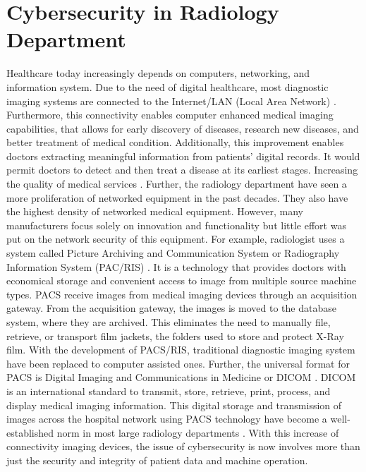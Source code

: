 \documentclass[pdf,bookmarks,colorlinks=true]{IEEEtran}
\begin{document}
\section{Cybersecurity in Radiology Department}
\label{sec:Radiology}
Healthcare today increasingly depends on computers, networking, and information system. Due to the need of digital healthcare, most diagnostic imaging systems are connected to the Internet/LAN (Local Area Network) \cite{ma2019medical}. Furthermore, this connectivity enables computer enhanced medical imaging capabilities, that allows for early discovery of diseases, research new diseases, and better treatment of medical condition. Additionally, this improvement enables doctors extracting meaningful information from patients' digital records. It would permit doctors to detect and then treat a disease at its earliest stages. Increasing the quality of medical services \cite{Marwan}.
Further, the radiology department have seen a more proliferation of networked equipment in the past decades. They also have the highest density of networked medical equipment. However, many manufacturers focus solely on innovation and functionality but little effort was put on the network security of this equipment. For example, radiologist uses a system called Picture Archiving and Communication System or Radiography Information System (PAC/RIS) \cite{ferrara2019cybersecurity}. It is a technology that provides doctors with economical storage and convenient access to image from multiple source machine types. PACS receive images from medical imaging devices through an acquisition gateway. From the acquisition gateway, the images is moved to the database system, where they are archived. This eliminates the need to manually file, retrieve, or transport film jackets, the folders used to store and protect X-Ray film. With the development of PACS/RIS, traditional diagnostic imaging system have been replaced to computer assisted ones. Further, the universal format for PACS is Digital Imaging and Communications in Medicine or DICOM \cite{InformationSecurityonDiagnosticImagingSystem}. DICOM is an international standard to transmit, store, retrieve, print, process, and display medical imaging information. This digital storage and transmission of images across the hospital network using PACS technology have become a well-established norm in most large radiology departments \cite{moses2015lack}. With this increase of connectivity imaging devices, the issue of cybersecurity is now involves more than just the security and integrity of patient data and machine operation. \par 
\end{document}
